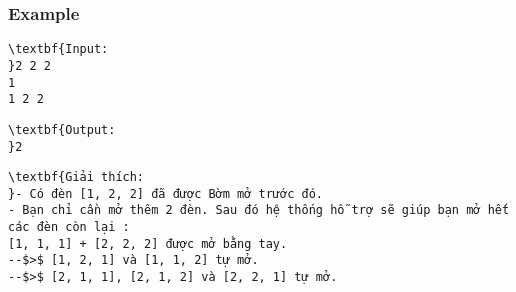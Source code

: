\subsubsection{Example}
\begin{verbatim}
\textbf{Input:
}2 2 2
1
1 2 2\end{verbatim}
\begin{verbatim}
\textbf{Output:
}2\end{verbatim}
\begin{verbatim}
\textbf{Giải thích:
}- Có đèn [1, 2, 2] đã được Bờm mở trước đó.
- Bạn chỉ cần mở thêm 2 đèn. Sau đó hệ thống hỗ trợ sẽ giúp bạn mở hết các đèn còn lại :
[1, 1, 1] + [2, 2, 2] được mở bằng tay.
--$>$ [1, 2, 1] và [1, 1, 2] tự mở.
--$>$ [2, 1, 1], [2, 1, 2] và [2, 2, 1] tự mở.
\end{verbatim}